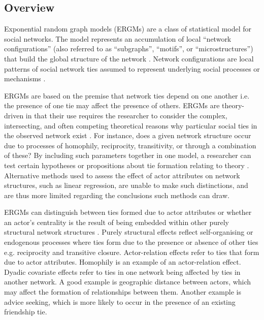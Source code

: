 \subsection{Overview}

Exponential random graph models (ERGMs) are a class of statistical model for social networks. The model represents an accumulation of local \enquote{network configurations} (also referred to as \enquote{subgraphs}, \enquote{motifs}, or \enquote{microstructures}) that build the global structure of the network \citep{robins2013tutorial}. Network configurations are local patterns of social network ties assumed to represent underlying social processes or mechanisms \citep{lusher2013exponential}. \medskip

ERGMs are based on the premise that network ties depend on one another i.e. the presence of one tie may affect the presence of others. ERGMs are theory-driven in that their use requires the researcher to consider the complex, intersecting, and often competing theoretical reasons why particular social ties in the observed network exist \citep{lusher2013exponential}. For instance, does a given network structure occur due to processes of homophily, reciprocity, transitivity, or through a combination of these? By including such parameters together in one model, a researcher can test certain hypotheses or propositions about tie formation relating to theory \citep{robins2007recent}. Alternative methods used to assess the effect of actor attributes on network structures, such as linear regression, are unable to make such distinctions, and are thus more limited regarding the conclusions such methods can draw. \medskip

ERGMs can distinguish between ties formed due to actor attributes or whether an actor’s centrality is the result of being embedded within other purely structural network structures \citep{lusher2013exponential}. Purely structural effects reflect self-organising or endogenous processes where ties form due to the presence or absence of other ties e.g. reciprocity and transitive closure. Actor-relation effects refer to ties that form due to actor attributes. Homophily is an example of an actor-relation effect.  Dyadic covariate effects refer to ties in one network being affected by ties in another network. A good example is geographic distance between actors, which may affect the formation of relationships between them. Another example is advice seeking, which is more likely to occur in the presence of an existing friendship tie. \medskip

